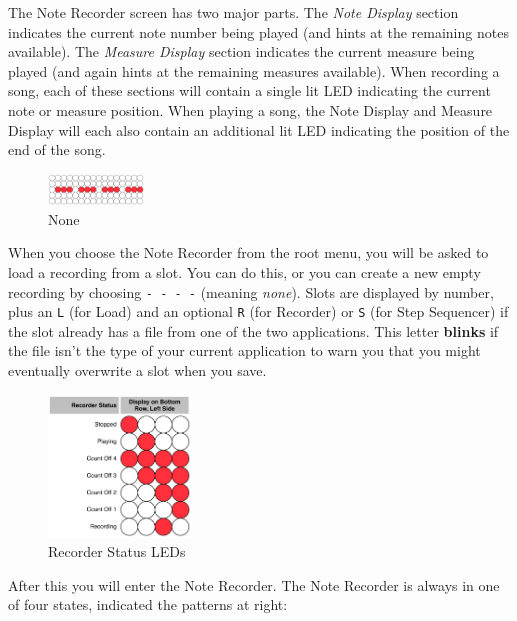 \documentclass{article}
\begin{document}
The Note Recorder screen has two major parts.  The {\it Note Display} section indicates the current note number being played (and hints at the remaining notes available).  The {\it Measure Display} section indicates the current measure being played (and again hints at the remaining measures available).  When recording a song, each of these sections will contain a single lit LED indicating the current note or measure position.  When playing a song, the Note Display and Measure Display will each also contain an additional lit LED indicating the position of the end of the song.

\begin{figure}
\includegraphics[width=1in]{none.pdf}
\vspace{-2em}\caption{\small None}\vspace{-1em}
\label{none}
\end{figure}

When you choose the Note Recorder from the root menu, you will be asked to load a recording from a slot.  You can do this, or you can create a new empty recording by choosing \texttt{-~-~-~-} (meaning {\it none}).  Slots are displayed by number, plus an \texttt{L} (for Load) and an optional \texttt{R} (for Recorder) or \texttt{S} (for Step Sequencer) if the slot already has a file from one of the two applications.  This letter {\bf blinks} if the file isn't the type of your current application to warn you that you might eventually overwrite a slot when you save.

\begin{figure}
\includegraphics[width=1.5in]{recorderstatus.pdf}
\vspace{-2em}\caption{\small Recorder Status LEDs}\vspace{-4em}
\label{recorderstatus}
\end{figure}

After this you will enter the Note Recorder.  The Note Recorder is always in one of four states, indicated the patterns at right:
\end{document}
